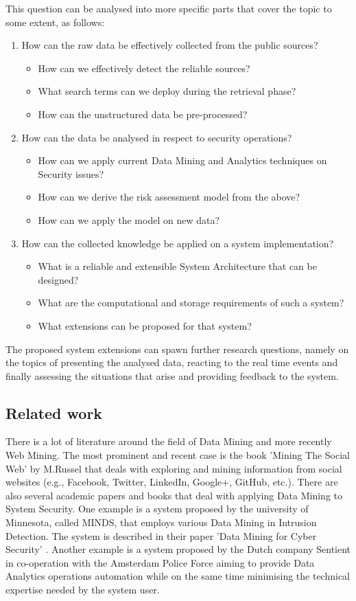 \documentclass[12pt]{article}
\begin{document}
\noindent
This question can be analysed into more specific parts that cover the topic to some extent, as follows:

\begin{enumerate}
	\item How can the raw data be effectively collected from the public sources? 
	\begin{itemize}
		\item How can we effectively detect the reliable sources?
		\item What search terms can we deploy during the retrieval phase?
		\item How can the unstructured data be pre-processed? 
	\end{itemize}
	\item How can the data be analysed in respect to security operations?
	\begin{itemize}
		\item How can we apply current Data Mining and Analytics techniques on Security issues?
		\item How can we derive the risk assessment model from the above?
		\item How can we apply the model on new data?
	\end{itemize}
	\item	How can the collected knowledge be applied on a system implementation?
	\begin{itemize}
		\item What is a reliable and extensible System Architecture that can be designed?
		\item What are the computational and storage requirements of such a system?
		\item What extensions can be proposed for that system?
	\end{itemize}
\end{enumerate}

The proposed system extensions can spawn further research questions, namely on the topics of presenting the analysed data, reacting to the real time events and finally assessing the situations that arise and providing feedback to the system.


\subsection{Related work}
There is a lot of literature around the field of Data Mining and more recently Web Mining. The most prominent and recent case is the book 'Mining The Social Web' by M.Russel \cite{socialweb} that deals with exploring and mining information from social websites (e.g., Facebook, Twitter, LinkedIn, Google+, GitHub, etc.). There are also several academic papers and books that deal with applying Data Mining to System Security. One example is a system proposed by the university of Minnesota, called MINDS, that employs various Data Mining in Intrusion Detection. The system is described in their paper 'Data Mining for Cyber Security' \cite{minds}.  Another example is a system proposed by the Dutch company Sentient in co-operation with the Amsterdam Police Force \cite{police} aiming to provide Data Analytics operations automation while on the same time minimising the technical expertise needed by the system user. 
\end{document}
